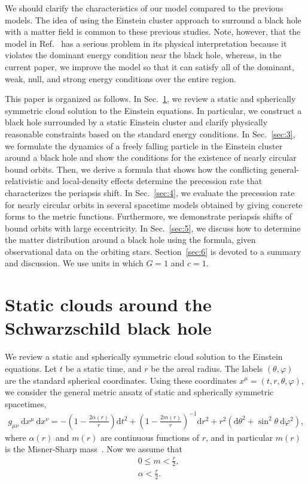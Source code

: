 \documentclass[aps,11pt,nofootinbib,preprintnumbers,groupedaddress,superscriptaddress]{revtex4-2}
\begin{document}
We should clarify the characteristics of our model compared to the previous models. 
The idea of using the Einstein cluster approach to surround a black hole with a matter field is common to these previous studies. 
Note, however, that the model in Ref.~\cite{Cardoso:2021wlq} 
has a serious problem in its physical interpretation because it
violates the dominant energy condition near the black hole, 
whereas, in the current paper, we improve the model so that it can
satisfy all of the dominant, weak, null, and strong energy conditions
over the entire region. 



This paper is organized as follows. 
In Sec.~\ref{sec:2}, we review a static and spherically symmetric cloud solution to the Einstein equations. In particular, we construct 
a black hole surrounded by a
static Einstein cluster and clarify 
physically reasonable constraints based on the standard energy conditions.
In Sec.~\ref{sec:3}, we formulate 
the dynamics of a freely falling particle
in the Einstein cluster around a black hole and show the conditions for the existence of nearly circular 
bound orbits.
Then, we derive a formula that shows how the conflicting general-relativistic and 
local-density effects determine the precession rate that characterizes 
the periapsis shift.
In Sec.~\ref{sec:4}, we evaluate the precession rate 
for nearly circular orbits in 
several 
spacetime models obtained by giving concrete forms to the metric functions.
Furthermore, we demonstrate 
periapsis shifts of bound
orbits with 
large eccentricity.
In Sec.~\ref{sec:5}, we discuss how to determine the matter distribution around a black hole 
using the formula, given
observational data on the orbiting stars.
Section~\ref{sec:6} is devoted to 
a summary and discussion. 
We use units in which $G=1$ and $c=1$. 


\section{Static clouds around the Schwarzschild black hole}
\label{sec:2}
We review a static and spherically symmetric cloud solution to the Einstein equations. 
Let $t$ be a static time, and $r$ be the areal radius.
The labels $(\theta, \varphi)$ are the standard spherical coordinates. 
Using these coordinates $x^\mu=(t, r, \theta, \varphi)$, we consider 
the general metric ansatz of static and spherically symmetric spacetimes,
\begin{align}
\label{eq:met2}
g_{\mu\nu}\:\!\mathrm{d}x^\mu\:\!\mathrm{d}x^\nu
=-\left(1-\frac{2\alpha(r)}{r}\right)\mathrm{d}t^2+\left(1-\frac{2m(r)}{r}\right)^{-1}\mathrm{d}r^2+r^2 (\mathrm{d}\theta^2+\sin^2\theta\:\!\mathrm{d}\varphi^2),
\end{align}
where $\alpha(r)$ and $m(r)$ are continuous functions of $r$, and in particular $m(r)$ is the Misner-Sharp mass~\cite{Misner:1964je,Hayward:1994bu}. 
Now we assume that 
\begin{align}
\label{eq:maspt}
&0\le m<\frac{r}{2},
\\
\label{eq:alppt}
&\alpha <\frac{r}{2}.
\end{align}
\end{document}
